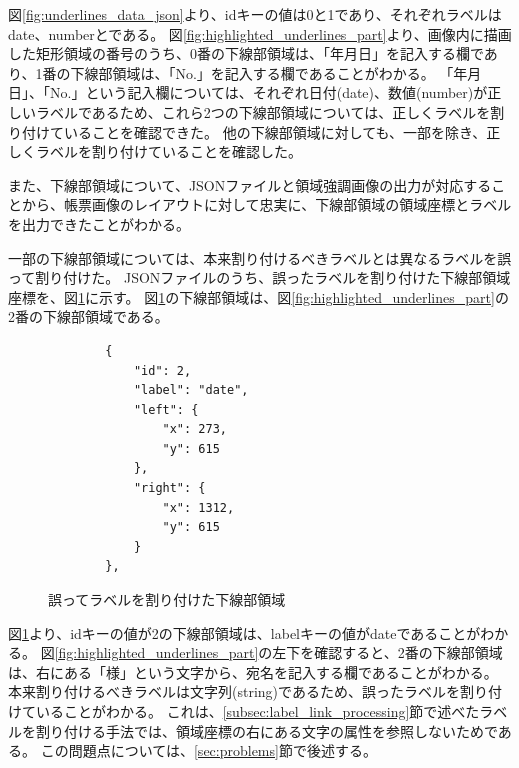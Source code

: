 図\ref{fig:underlines_data_json}より、idキーの値は0と1であり、それぞれラベルはdate、numberとである。
図\ref{fig:highlighted_underlines_part}より、画像内に描画した矩形領域の番号のうち、0番の下線部領域は、「年月日」を記入する欄であり、1番の下線部領域は、「No.」を記入する欄であることがわかる。
「年月日」、「No.」という記入欄については、それぞれ日付(date)、数値(number)が正しいラベルであるため、これら2つの下線部領域については、正しくラベルを割り付けていることを確認できた。
他の下線部領域に対しても、一部を除き、正しくラベルを割り付けていることを確認した。

また、下線部領域について、JSONファイルと領域強調画像の出力が対応することから、帳票画像のレイアウトに対して忠実に、下線部領域の領域座標とラベルを出力できたことがわかる。

一部の下線部領域については、本来割り付けるべきラベルとは異なるラベルを誤って割り付けた。
JSONファイルのうち、誤ったラベルを割り付けた下線部領域座標を、図\ref{fig:underlines_data_miss_json}に示す。
図\ref{fig:underlines_data_miss_json}の下線部領域は、図\ref{fig:highlighted_underlines_part}の2番の下線部領域である。

\lstset{language=}
\begin{figure}[t]
    \begin{lstlisting}
        {
            "id": 2,
            "label": "date",
            "left": {
                "x": 273,
                "y": 615
            },
            "right": {
                "x": 1312,
                "y": 615
            }
        },
    \end{lstlisting}
    \caption{誤ってラベルを割り付けた下線部領域}\label{fig:underlines_data_miss_json}
\end{figure}

図\ref{fig:underlines_data_miss_json}より、idキーの値が2の下線部領域は、labelキーの値がdateであることがわかる。
図\ref{fig:highlighted_underlines_part}の左下を確認すると、2番の下線部領域は、右にある「様」という文字から、宛名を記入する欄であることがわかる。
本来割り付けるべきラベルは文字列(string)であるため、誤ったラベルを割り付けていることがわかる。
これは、\ref{subsec:label_link_processing}節で述べたラベルを割り付ける手法では、領域座標の右にある文字の属性を参照しないためである。
この問題点については、\ref{sec:problems}節で後述する。